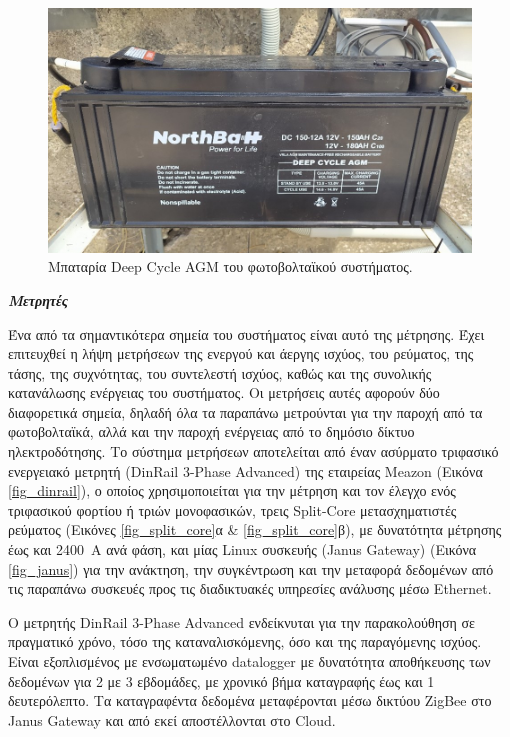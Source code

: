 \documentclass[12pt, a4paper]{report} %
\newcommand{\english}{\foreignlanguage{english}}
\begin{document}
\begin{figure}[ht]%
    \centering
    \includegraphics[scale=0.9]{Figures/battery.jpg}
    \caption{Mπαταρία \english{Deep Cycle AGM} του φωτοβολταϊκού συστήματος.}
    \label{fig_battery}
\end{figure}

\noindent \textit{\textbf{Μετρητές}}

\vspace{0.2cm}

Ένα από τα σημαντικότερα σημεία του συστήματος είναι αυτό της μέτρησης. Έχει επιτευχθεί η λήψη μετρήσεων της ενεργού 
και άεργης ισχύος, του ρεύματος, της τάσης, της συχνότητας, του συντελεστή ισχύος, καθώς και της συνολικής κατανάλωσης 
ενέργειας του συστήματος. Οι μετρήσεις αυτές αφορούν δύο διαφορετικά σημεία, δηλαδή όλα τα παραπάνω μετρούνται για την 
παροχή από τα φωτοβολταϊκά, αλλά και την παροχή ενέργειας από το δημόσιο δίκτυο ηλεκτροδότησης. Το σύστημα μετρήσεων 
αποτελείται από έναν ασύρματο τριφασικό ενεργειακό μετρητή (\english{DinRail 3-Phase Advanced}) της εταιρείας 
\english{Meazon} (Εικόνα \ref{fig_dinrail}), ο οποίος χρησιμοποιείται για την μέτρηση και τον έλεγχο ενός τριφασικού 
φορτίου ή τριών μονοφασικών, τρεις \english{Split-Core} μετασχηματιστές ρεύματος (Εικόνες \ref{fig_split_core}α \& 
\ref{fig_split_core}β), με δυνατότητα μέτρησης έως και \SI{2400}{\ampere} ανά φάση, και μίας \english{Linux} συσκευής 
(\english{Janus Gateway}) (Εικόνα \ref{fig_janus}) για την ανάκτηση, την συγκέντρωση και την μεταφορά δεδομένων από 
τις παραπάνω συσκευές προς τις διαδικτυακές υπηρεσίες ανάλυσης μέσω \english{Ethernet}.

Ο μετρητής \english{DinRail 3-Phase Advanced} ενδείκνυται για την παρακολούθηση σε πραγματικό χρόνο, τόσο της 
καταναλισκόμενης, όσο και της παραγόμενης ισχύος. Είναι εξοπλισμένος με ενσωματωμένο \english{datalogger} με δυνατότητα 
αποθήκευσης των δεδομένων για 2 με 3 εβδομάδες, με χρονικό βήμα καταγραφής έως και 1 δευτερόλεπτο. Τα καταγραφέντα 
δεδομένα μεταφέρονται μέσω δικτύου \english{ZigBee} στο \english{Janus Gateway} και από εκεί αποστέλλονται στο 
\english{Cloud}.
\end{document}
